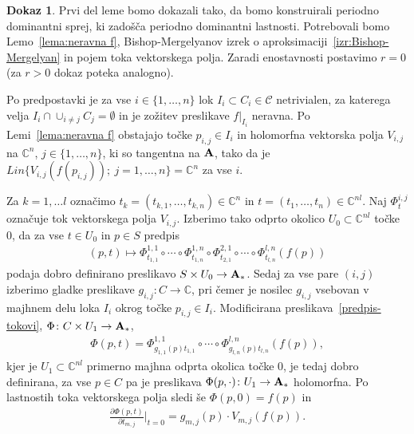 \documentclass[12pt,a4paper,twoside]{article}
\theoremstyle{definition} %
\newtheorem{dokaz}{Dokaz}
\theoremstyle{plain} %
\numberwithin{equation}{section}  %
\newcommand{\C}{\mathbb C}
\begin{document}
\begin{dokaz}
Prvi del leme bomo dokazali tako, da bomo konstruirali periodno dominantni sprej, ki zadošča periodno dominantni lastnosti. Potrebovali bomo Lemo~\ref{lema:neravna f}, Bishop-Mergelyanov izrek o aproksimaciji~\ref{izr:Bishop-Mergelyan} in pojem toka vektorskega polja.
Zaradi enostavnosti postavimo $r=0$ (za $r>0$ dokaz poteka analogno).

Po predpostavki je za vse $i \in \{ 1, \dots, n \}$ lok $I_{i} \subset C_{i} \in \mathcal{C}$ netrivialen, za katerega velja $I_{i} \cap \cup_{i \neq j} C_{j} = \emptyset$ in je zožitev preslikave $f|_{I_{i}}$ neravna. Po Lemi~\ref{lema:neravna f} obstajajo točke $p_{i,j} \in I_{i}$ in holomorfna vektorska polja $V_{i,j}$ na $\C^{n}$, $j \in \{1, \dots, n \}$, ki so tangentna na $\textbf{\textup{A}}$, tako da je $Lin \{ V_{i,j}(f(p_{i,j})) ; \ j = 1, \dots, n \} = \C^{n}$ za vse $i$.

Za $k = 1, \dots l$ označimo $t_{k} = (t_{k,1}, \dots, t_{k,n}) \in \C^{n}$ in $t = (t_{1}, \dots, t_{n}) \in \C^{nl}$. Naj $\Phi_{t}^{i,j}$ označuje tok vektorskega polja $V_{i,j}$.
Izberimo tako odprto okolico $U_{0} \subset \C^{nl}$ točke $0$, da za vse $t \in U_{0}$ in $p \in S$ predpis
\begin{align} \label{predpis-tokovi}
(p, t) \mapsto \Phi_{t_{1,1}}^{1,1} \circ \cdots \circ \Phi_{t_{1,n}}^{1,n} \circ \Phi_{t_{2,1}}^{2,1} \circ \cdots \circ \Phi_{t_{l,n}}^{l,n} (f(p))
\end{align}
podaja dobro definirano preslikavo $S \times U_{0} \to \textbf{\textup{A}}_{*}$.
Sedaj za vse pare $(i,j)$ izberimo gladke preslikave $g_{i,j} \colon C \to \C$, pri čemer je nosilec $g_{i,j}$ vsebovan v majhnem delu loka $I_{i}$ okrog točke $p_{i,j} \in I_{i}$.
Modificirana preslikava~\ref{predpis-tokovi}, $\Phi \colon C \times U_{1} \to \textbf{\textup{A}}_{*}$,
\begin{align} \label{predpis-Phi}
\Phi(p,t) = \Phi_{g_{1,1}(p)t_{1,1}}^{1,1} \circ \cdots \circ \Phi_{g_{l,n}(p)t_{l,n}}^{l,n} (f(p)),
\end{align}
kjer je $U_{1} \subset \C^{nl}$ primerno majhna odprta okolica točke $0$, je tedaj dobro definirana, za vse $p \in C$ pa je preslikava $\Phi(p, \cdot) \colon U_{1} \to \textbf{\textup{A}}_{*}$ holomorfna. Po lastnostih toka vektorskega polja sledi še $\Phi(p,0) = f(p)$ in
\begin{align} \label{dPhi/dt}
\frac{\partial \Phi(p,t)}{\partial t_{m,j}} \Big|_{t=0} = g_{m,j}(p) \cdot V_{m,j}(f(p)).
\end{align}


\end{dokaz}
\end{document}
